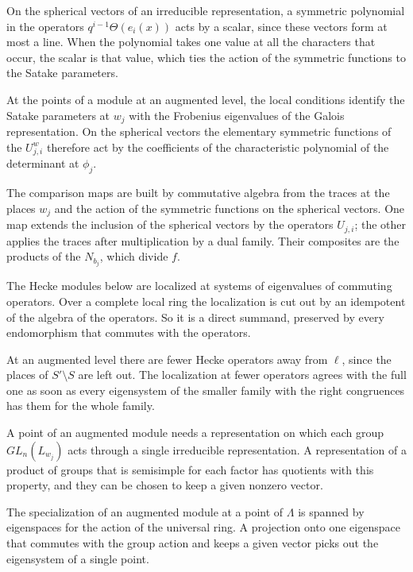 On the spherical vectors of an irreducible representation, a symmetric polynomial in the operators $q^{i-1}\Theta(e_i(x))$ acts by a scalar, since these vectors form at most a line. When the polynomial takes one value at all the characters that occur, the scalar is that value, which ties the action of the symmetric functions to the Satake parameters.

At the points of a module at an augmented level, the local conditions identify the Satake parameters at $w_j$ with the Frobenius eigenvalues of the Galois representation. On the spherical vectors the elementary symmetric functions of the $U^w_{j,i}$ therefore act by the coefficients of the characteristic polynomial of the determinant at $\phi_j$.

The comparison maps are built by commutative algebra from the traces at the places $w_j$ and the action of the symmetric functions on the spherical vectors. One map extends the inclusion of the spherical vectors by the operators $U_{j,i}$; the other applies the traces after multiplication by a dual family. Their composites are the products of the $N_{b_j}$, which divide $f$.

The Hecke modules below are localized at systems of eigenvalues of commuting operators. Over a complete local ring the localization is cut out by an idempotent of the algebra of the operators. So it is a direct summand, preserved by every endomorphism that commutes with the operators.

At an augmented level there are fewer Hecke operators away from $\ell$, since the places of $S'\setminus S$ are left out. The localization at fewer operators agrees with the full one as soon as every eigensystem of the smaller family with the right congruences has them for the whole family.

A point of an augmented module needs a representation on which each group $GL_n(L_{w_j})$ acts through a single irreducible representation. A representation of a product of groups that is semisimple for each factor has quotients with this property, and they can be chosen to keep a given nonzero vector.

The specialization of an augmented module at a point of $\Lambda$ is spanned by eigenspaces for the action of the universal ring. A projection onto one eigenspace that commutes with the group action and keeps a given vector picks out the eigensystem of a single point.

